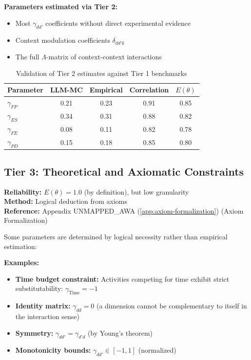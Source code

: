 \documentclass[11pt,a4paper]{article}
\theoremstyle{definition}
\begin{document}
\textbf{Parameters estimated via Tier 2:}
\begin{itemize}
    \item Most $\gamma_{dd'}$ coefficients without direct experimental evidence
    \item Context modulation coefficients $\delta_{dd'k}$
    \item The full $\Lambda$-matrix of context-context interactions
\end{itemize}

\begin{table}[h]
\centering
\small
\begin{tabular}{lcccc}
\toprule
\textbf{Parameter} & \textbf{LLM-MC} & \textbf{Empirical} & \textbf{Correlation} & $E(\theta)$ \\
\midrule
$\gamma_{FP}$ & 0.21 & 0.23 & 0.91 & 0.85 \\
$\gamma_{ES}$ & 0.34 & 0.31 & 0.88 & 0.82 \\
$\gamma_{FE}$ & 0.08 & 0.11 & 0.82 & 0.78 \\
$\gamma_{PD}$ & 0.15 & 0.18 & 0.85 & 0.80 \\
\bottomrule
\end{tabular}
\caption{Validation of Tier 2 estimates against Tier 1 benchmarks}
\label{tab:tier2-validation}
\end{table}

\subsection{Tier 3: Theoretical and Axiomatic Constraints}

\begin{tcolorbox}[colback=gray!5!white, colframe=gray!75!black]
\textbf{Reliability:} $E(\theta) = 1.0$ (by definition), but low granularity \\
\textbf{Method:} Logical deduction from axioms \\
\textbf{Reference:} Appendix UNMAPPED_AWA (\ref{app:axiom-formalization}) (Axiom Formalization)
\end{tcolorbox}

Some parameters are determined by logical necessity rather than empirical 
estimation:

\textbf{Examples:}
\begin{itemize}
    \item \textbf{Time budget constraint:} Activities competing for time exhibit 
    strict substitutability: $\gamma_{\text{Time}} = -1$
    \item \textbf{Identity matrix:} $\gamma_{dd} = 0$ (a dimension cannot be 
    complementary to itself in the interaction sense)
    \item \textbf{Symmetry:} $\gamma_{dd'} = \gamma_{d'd}$ (by Young's theorem)
    \item \textbf{Monotonicity bounds:} $\gamma_{dd'} \in [-1, 1]$ (normalized)
\end{itemize}
\end{document}
